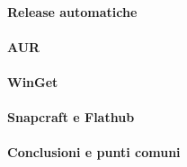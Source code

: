 \paragraph{Release automatiche}

\paragraph{AUR}

\paragraph{WinGet}

\paragraph{Snapcraft e Flathub}

\paragraph{Conclusioni e punti comuni}